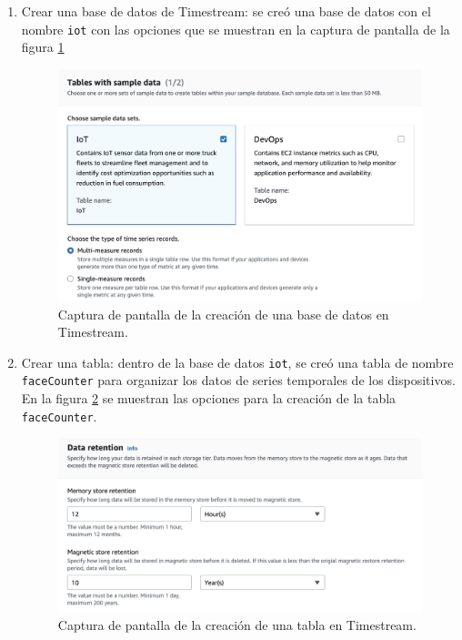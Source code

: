 \begin{enumerate}
	\item Crear una base de datos de Timestream: se creó una base de datos con el nombre \texttt{iot} con las opciones que se muestran en la captura de pantalla de la figura \ref{fig:cc_ts_opt}
	\begin{figure}[h]
		\centering
		\includegraphics[scale=0.5]{./Figures/cc_ts_opt.png}
		\caption{Captura de pantalla de la creación de una base de datos en Timestream.}
		\label{fig:cc_ts_opt}
	\end{figure}
	
	\item Crear una tabla: dentro de la base de datos \texttt{iot}, se creó una tabla de nombre \texttt{faceCounter} para organizar los datos de series temporales de los dispositivos. En la figura \ref{fig:cc_ts_table} se muestran las opciones para la creación de la tabla \texttt{faceCounter}.
	\begin{figure}[h]
		\centering
		\includegraphics[scale=0.5]{./Figures/cc_ts_table.png}
		\caption{Captura de pantalla de la creación de una tabla en Timestream.}
		\label{fig:cc_ts_table}
	\end{figure}
	

\end{enumerate}
